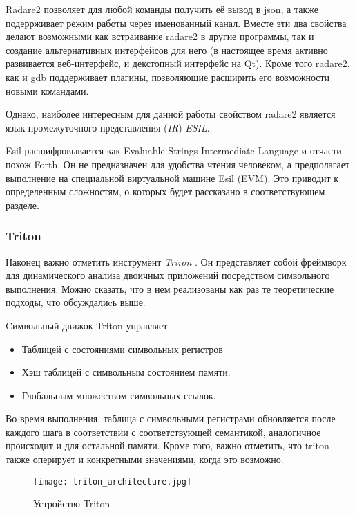 \bigskip

Radare2 позволяет для любой команды получить её вывод в json, а также подеррживает режим работы через именованный канал. Вместе эти два свойства делают возможными как встраивание radare2 в другие программы, так и создание альтернативных интерфейсов для него (в настоящее время активно развивается веб-интерфейс, и декстопный интерфейс на Qt).
Кроме того radare2, как и gdb поддерживает плагины, позволяющие расширить его возможности новыми командами.

Однако, наиболее интересным для данной работы свойством radare2 является язык промежуточного представления ({\em IR}) {\em ESIL}.

Esil расшифровывается как Evaluable Strings Intermediate Language и отчасти похож Forth. Он не предназначен для удобства чтения человеком, а предполагает выполнение на специальной виртуальной машине Esil (EVM).
Это приводит к определенным сложностям, о которых будет рассказано в соответствующем разделе.

\subsubsection{Triton}

Наконец важно отметить инструмент {\em Triron} \cite{Triton}. Он представляет собой фреймворк для динамического анализа двоичных приложений посредством символьного выполнения. Можно сказать, что в нем реализованы как раз те теоретические подходы, что обсуждалиcь выше.

Cимвольный движок Triton управляет

\begin{itemize}
\item Таблицей с состояниями символьных регистров

\item Хэш таблицей с символьным состоянием памяти.

\item Глобальным множеством символьных ссылок.

\end{itemize}

Во время выполнения, таблица с символьными регистрами обновляется после каждого шага в соответствии с соответствующей семантикой, аналогичное происходит и для остальной памяти. Кроме того, важно отметить, что triton также оперирует и конкретными значениями, когда это возможно.



\begin{figure}[h]
\centering
\texttt{[image: triton\_architecture.jpg]}
\caption{Устройство Triton}
\label{fig:triton1}
\end{figure}

